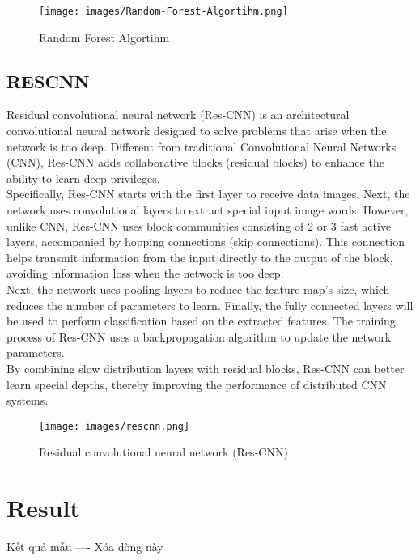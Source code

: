 \documentclass{ieeeojies}
\begin{document}
\begin{figure}[H]
    \centering
    \begin{minipage}{0.28\textwidth}
    \centering
   \texttt{[image: images/Random-Forest-Algortihm.png]}
    \caption{Random Forest Algortihm}
    \label{fig:1}
    \end{minipage}
\end{figure}

\subsection{RESCNN}
\indent Residual convolutional neural network (Res-CNN) is an architectural convolutional neural network designed to solve problems that arise when the network is too deep. Different from traditional Convolutional Neural Networks (CNN), Res-CNN adds collaborative blocks (residual blocks) to enhance the ability to learn deep privileges.
\\
\indent Specifically, Res-CNN starts with the first layer to receive data images. Next, the network uses convolutional layers to extract special input image words. However, unlike CNN, Res-CNN uses block communities consisting of 2 or 3 fast active layers, accompanied by hopping connections (skip connections). This connection helps transmit information from the input directly to the output of the block, avoiding information loss when the network is too deep.
\\
\indent Next, the network uses pooling layers to reduce the feature map's size, which reduces the number of parameters to learn. Finally, the fully connected layers will be used to perform classification based on the extracted features. The training process of Res-CNN uses a backpropagation algorithm to update the network parameters.
\\
\indent By combining slow distribution layers with residual blocks, Res-CNN can better learn special depths, thereby improving the performance of distributed CNN systems.

\begin{figure}[H]
    \centering
    \begin{minipage}{0.28\textwidth}
    \centering
   \texttt{[image: images/rescnn.png]}
    \caption{Residual convolutional neural network (Res-CNN)}
    \label{fig:1}
    \end{minipage}
\end{figure}

\section{Result}
Kết quả mẫu ---- Xóa dòng này
\end{document}
